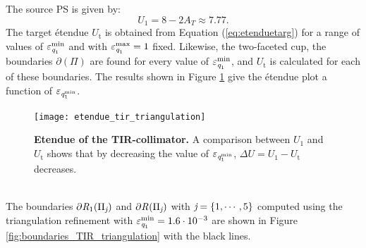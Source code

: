 The source PS is given by:
\begin{equation}
U_1 = 8-2A_T\approx 7.77.
\end{equation}
The target \'{e}tendue $U_{\textrm{t}}$ is obtained from Equation (\ref{eq:etenduetarg}) for a range of values of $\varepsilon_{\textit{q}_1}^{\textrm{min}}$ and with $\varepsilon_{\textit{q}_1}^{\textrm{max}}=1$ fixed. Likewise, the two-faceted cup, the boundaries $\partial$$(\Pi)$ are found for every value of $\varepsilon_{\textit{q}_1}^{\textrm{min}}$, and $U_{\textrm{t}}$ is calculated for each of these boundaries. 
The results shown in Figure \ref{fig:etendue_tir_triangulation} give the \'{e}tendue plot a function of $\varepsilon_{\textit{q}_{1}^{\textrm{min}}}$.
 \begin{figure}[h!]
  \center
  \texttt{[image: etendue\_tir\_triangulation]}
  \caption{\textbf{Etendue of the TIR-collimator.} A comparison between $U_1$ and $U_{\textrm{t}}$ shows that by decreasing the value of $\varepsilon_{\textit{q}_{1}^{\textrm{min}}}$, $\Delta U= U_1-U_{\textrm{t}}$ decreases.}
  \label{fig:etendue_tir_triangulation}
\end{figure}
\\ \indent The boundaries $\partial\mbox{$\emph{R}_{\textit{$1$}}$}(\Pi_{\textit{j}})$ and $\partial\mbox{$\emph{R}_{\textit{}}$}(\Pi_{\textit{j}})$ with $\textit{j} = \{1, \cdots, 5\}$ computed using the triangulation refinement with 
$\varepsilon_{\textit{q}_1}^{\textrm{min}}=1.6\cdot 10^{-3}$ are shown in Figure \ref{fig:boundaries_TIR_triangulation} with the black lines. 
